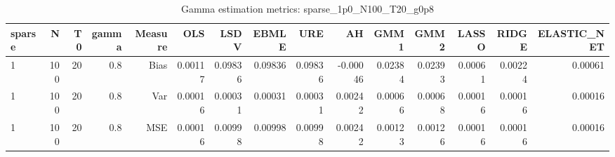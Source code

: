 \begin{table}[!htbp]\centering
\caption{Gamma estimation metrics: sparse_1p0_N100_T20_g0p8}
\label{tab:table1_sparse_1p0_N100_T20_g0p8}
\begin{tabular}{lrrrrrrrrrrrrrr}
\hline
sparse & N & T0 & gamma & Measure & OLS & LSDV & EBMLE & URE & AH & GMM1 & GMM2 & LASSO & RIDGE & ELASTIC_NET \\
\hline
1 & 100 & 20 & 0.8 & Bias & 0.00117 & 0.09836 & 0.09836 & 0.09836 & -0.00046 & 0.02384 & 0.02393 & 0.00061 & 0.00224 & 0.00061 \\
1 & 100 & 20 & 0.8 & Var & 0.00016 & 0.00031 & 0.00031 & 0.00031 & 0.00242 & 0.00066 & 0.00068 & 0.00016 & 0.00016 & 0.00016 \\
1 & 100 & 20 & 0.8 & MSE & 0.00016 & 0.00998 & 0.00998 & 0.00998 & 0.00242 & 0.00123 & 0.00126 & 0.00016 & 0.00016 & 0.00016 \\
\hline
\end{tabular}
\end{table}

